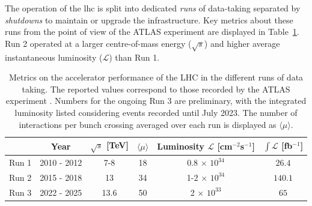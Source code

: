 The operation of the \gls{lhc} is split into dedicated \textit{runs} of data-taking separated by \textit{shutdowns} to maintain or upgrade the infrastructure. Key metrics about these runs from the point of view of the ATLAS experiment are displayed in Table~\ref{tbl:LHCATLASperf}. Run 2 operated at a larger centre-of-mass energy ($\sqrt{s}$) and higher average instantaneous luminosity ($\mathcal{L}$) than Run 1.

\begin{table}[!htbp]
  \begin{center}
      \renewcommand{\arraystretch}{1.2}
      \begin{tabular}{cc|cccc} \hline \hline 
        & Year & $\sqrt{s}$ [TeV] & $\langle \mu \rangle$ &  Luminosity $\mathcal{L}$ [cm$^{-2}$s$^{-1}$] & $\int\mathcal{L}$ [fb$^{-1}$] \\ \hline
        Run 1 & 2010 - 2012 & 7-8    & 18 & 0.8 $\times$ $10^{34}$    & $26.4$ \\
        Run 2 & 2015 - 2018 & 13     & 34 & 1-2 $\times$ $10^{34}$  & $140.1$ \\
        Run 3 & 2022 - 2025 & 13.6     & 50 & 2 $\times$ $10^{33}$    & $65$ \\

        \hline\hline
      \end{tabular}
    \caption{Metrics on the accelerator performance of the LHC in the different runs of data taking. The reported values correspond to those recorded by the ATLAS experiment \cite{ATLAS:run1Lumi, ATLAS:2022hro, ATL-DAPR-PUB-2023-001}. Numbers for the ongoing Run 3 are preliminary, with the integrated luminosity listed considering events recorded until July 2023. The number of interactions per bunch crossing averaged over each run is displayed as $\langle \mu \rangle$.}
    \label{tbl:LHCATLASperf}
  \end{center}
\end{table}

